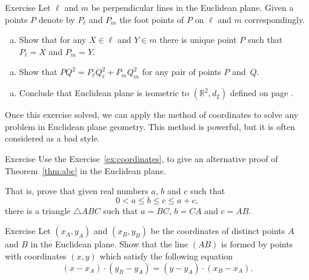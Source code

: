 \begin{thm}{Exercise}\label{ex:coordinates} 
Let $\ell$ and $m$ be perpendicular lines in the Euclidean plane.
Given a points $P$  denote by $P_\ell$ and $P_m$ the foot points of $P$ on $\ell$ and $m$ correspondingly.


\begin{enumerate}[(a)]
\item Show that for any $X\in \ell$ and $Y\in m$ there is unique point $P$ such that $P_\ell=X$ and $P_m=Y$.
\end{enumerate}

\begin{enumerate}[(a)]\addtocounter{enumi}{1}
\item
Show that 
$PQ^2=P_\ell Q_\ell^2+P_mQ_m^2$
for any pair of points $P$ and~$Q$.
\end{enumerate}

\begin{enumerate}[(a)]\addtocounter{enumi}{2}
\item Conclude that Euclidean plane is isometric to $(\mathbb{R}^2,d_2)$ defined on page \pageref{def:d_2}.
\end{enumerate}

\end{thm}

Once this exercise solved, we can apply 
the method of coordinates
to solve any problem in Euclidean plane geometry.
This method is powerful, 
but it is often considered as a bad style.

\begin{thm}{Exercise}\label{ex:abc}
Use the Exercise~\ref{ex:coordinates},
to give an alternative proof of Theorem~\ref{thm:abc} in the Euclidean plane.

That is, prove that given real numbers $a$, $b$ and $c$ such that 
 $$0<a\le b\le c\le a+c,$$
there is a triangle $\triangle ABC$
such that $a=BC$, $b=CA$ and $c=AB$.
\end{thm} 

\begin{thm}{Exercise}\label{ex:line-coord}
Let $(x_A,y_A)$ and $(x_B,y_B)$ be the coordinates of distinct points $A$ and $B$ in the Euclidean plane.
Show that the line $(AB)$ is formed by points with coordinates $(x,y)$ which satisfy the following equation
\[(x-x_A)\cdot (y_B-y_A)=(y-y_A)\cdot (x_B-x_A).\]

\end{thm}










